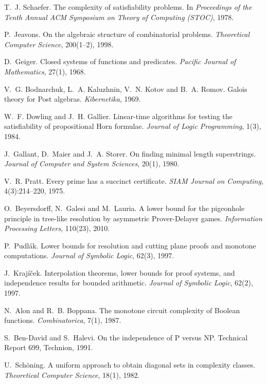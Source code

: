 T.~J. Schaefer.
\newblock The complexity of satisfiability problems.
\newblock In \emph{Proceedings of the Tenth Annual ACM Symposium on Theory of Computing (STOC)}, 1978.

P.~Jeavons.
\newblock On the algebraic structure of combinatorial problems.
\newblock \emph{Theoretical Computer Science}, 200(1--2), 1998.

D.~Geiger.
\newblock Closed systems of functions and predicates.
\newblock \emph{Pacific Journal of Mathematics}, 27(1), 1968.

V.~G. Bodnarchuk, L.~A. Kaluzhnin, V.~N. Kotov and B.~A. Romov.
\newblock Galois theory for Post algebras.
\newblock \emph{Kibernetika}, 1969.

W.~F. Dowling and J.~H. Gallier.
\newblock Linear-time algorithms for testing the satisfiability of propositional Horn formulae.
\newblock \emph{Journal of Logic Programming}, 1(3), 1984.

J.~Gallant, D.~Maier and J.~A. Storer.
\newblock On finding minimal length superstrings.
\newblock \emph{Journal of Computer and System Sciences}, 20(1), 1980.

V.~R. Pratt.
\newblock Every prime has a succinct certificate.
\newblock \emph{SIAM Journal on Computing}, 4(3):214--220, 1975.

O.~Beyersdorff, N.~Galesi and M.~Lauria.
\newblock A lower bound for the pigeonhole principle in tree-like resolution by asymmetric Prover-Delayer games.
\newblock \emph{Information Processing Letters}, 110(23), 2010.

P.~Pudl\'ak.
\newblock Lower bounds for resolution and cutting plane proofs and monotone computations.
\newblock \emph{Journal of Symbolic Logic}, 62(3), 1997.

J.~Kraj\'i\v{c}ek.
\newblock Interpolation theorems, lower bounds for proof systems, and independence results for bounded arithmetic.
\newblock \emph{Journal of Symbolic Logic}, 62(2), 1997.

N.~Alon and R.~B. Boppana.
\newblock The monotone circuit complexity of Boolean functions.
\newblock \emph{Combinatorica}, 7(1), 1987.

S.~Ben-David and S.~Halevi.
\newblock On the independence of {P} versus {NP}.
\newblock Technical Report 699, Technion, 1991.

U.~Sch\"oning.
\newblock A uniform approach to obtain diagonal sets in complexity classes.
\newblock \emph{Theoretical Computer Science}, 18(1), 1982.
